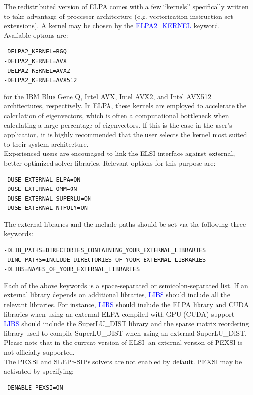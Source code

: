 \documentclass{report}
\begin{document}
The redistributed version of ELPA comes with a few ``kernels'' specifically written to take advantage of processor architecture (e.g. vectorization instruction set extensions).  A kernel may be chosen by the \textcolor{blue}{ELPA2\_KERNEL} keyword.  Available options are:
\begin{verbatim}
-DELPA2_KERNEL=BGQ
-DELPA2_KERNEL=AVX
-DELPA2_KERNEL=AVX2
-DELPA2_KERNEL=AVX512
\end{verbatim}

for the IBM Blue Gene Q, Intel AVX, Intel AVX2, and Intel AVX512 architectures, respectively.  In ELPA, these kernels are employed to accelerate the calculation of eigenvectors, which is often a computational bottleneck when calculating a large percentage of eigenvectors.  If this is the case in the user's application, it is highly recommended that the user selects the kernel most suited to their system architecture.\\

Experienced users are encouraged to link the ELSI interface against external, better optimized solver libraries.  Relevant options for this purpose are:
\begin{verbatim}
-DUSE_EXTERNAL_ELPA=ON
-DUSE_EXTERNAL_OMM=ON
-DUSE_EXTERNAL_SUPERLU=ON
-DUSE_EXTERNAL_NTPOLY=ON
\end{verbatim}

The external libraries and the include paths should be set via the following three keywords:
\begin{verbatim}
-DLIB_PATHS=DIRECTORIES_CONTAINING_YOUR_EXTERNAL_LIBRARIES
-DINC_PATHS=INCLUDE_DIRECTORIES_OF_YOUR_EXTERNAL_LIBRARIES
-DLIBS=NAMES_OF_YOUR_EXTERNAL_LIBRARIES
\end{verbatim}

Each of the above keywords is a space-separated or semicolon-separated list.  If an external library depends on additional libraries, \textcolor{blue}{LIBS} should include all the relevant libraries.  For instance, \textcolor{blue}{LIBS} should include the ELPA library and CUDA libraries when using an external ELPA compiled with GPU (CUDA) support; \textcolor{blue}{LIBS} should include the SuperLU\_DIST library and the sparse matrix reordering library used to compile SuperLU\_DIST when using an external SuperLU\_DIST.  Please note that in the current version of ELSI, an external version of PEXSI is not officially supported.\\

The PEXSI and SLEPc-SIPs solvers are not enabled by default.  PEXSI may be activated by specifying:
\begin{verbatim}
-DENABLE_PEXSI=ON
\end{verbatim}
\end{document}
